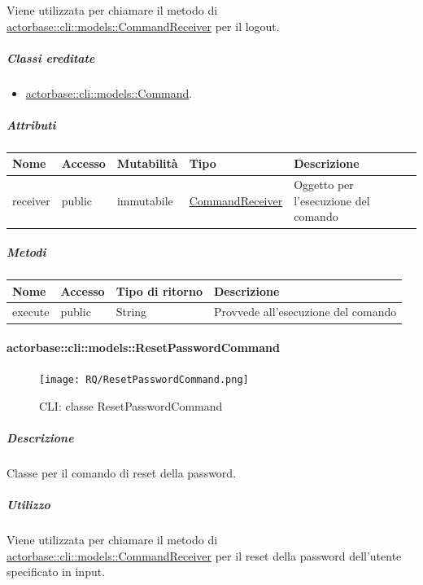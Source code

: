 \documentclass{scalatekids-article}
\begin{document}
Viene utilizzata per chiamare il metodo di
\hyperref[sec:actorbase::cli::models::CommandReceiver]{actorbase::cli::models::CommandReceiver} per il logout.

\subparagraph{Classi ereditate}

\begin{itemize}
\item \hyperref[sec:actorbase::cli::models::Command]{actorbase::cli::models::Command}.
\end{itemize}

\subparagraph{Attributi}

\begin{tabular}{| p{1cm} | p{1.5cm} | p{2cm} | p{4cm} | p{8.5cm} |}
  \hline
  Nome & Accesso & Mutabilità & Tipo & Descrizione\\
  \hline
  receiver & public & immutabile & \hyperref[sec:actorbase::cli::models::CommandReceiver]{CommandReceiver} & Oggetto per l'esecuzione del comando\\
  \hline
\end{tabular}

\subparagraph{Metodi}

\begin{tabular}{| l | l | l | l |}
  \hline
  Nome & Accesso & Tipo di ritorno & Descrizione\\
  \hline
  execute & public & String & Provvede all'esecuzione del comando\\
  \hline
\end{tabular}

\paragraph{actorbase::cli::models::ResetPasswordCommand}
\label{sec:actorbase::cli::models::ResetPasswordCommand}

\begin{figure}[H]
  \begin{center}
    \texttt{[image: RQ/ResetPasswordCommand.png]}
    \caption{CLI: classe ResetPasswordCommand}
  \end{center}
\end{figure}

\subparagraph{Descrizione}

Classe per il comando di reset della password.

\subparagraph{Utilizzo}

Viene utilizzata per chiamare il metodo di
\hyperref[sec:actorbase::cli::models::CommandReceiver]{actorbase::cli::models::CommandReceiver} per il reset della password
dell'utente specificato in input.
\end{document}
